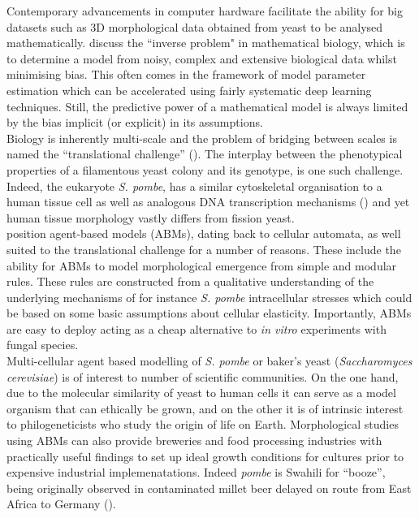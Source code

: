 Contemporary advancements in computer hardware facilitate 
the ability for big datasets such as 3D morphological data 
obtained from yeast to be analysed mathematically. \cite{clermont2015inverse} 
discuss the ``inverse problem" in mathematical biology, which is to determine a model 
from noisy, complex and extensive biological data whilst minimising bias. This often 
comes in the framework of model parameter estimation which 
can be accelerated using fairly systematic deep learning techniques. Still, the predictive power
of a mathematical model is always limited by the bias implicit (or explicit) in its assumptions.
\\

Biology is inherently multi-scale and the problem 
of bridging between scales is named the ``translational challenge'' (\cite{an2009agent}).
The interplay between the phenotypical properties of a filamentous yeast colony and 
its genotype, is one such challenge. Indeed, the eukaryote \textit{S. pombe}, has a similar 
cytoskeletal organisation to a human tissue cell as well as analogous DNA transcription mechanisms 
(\cite{hoffman2015ancient}) and yet human tissue 
morphology vastly differs from fission yeast.
\\

\cite{an2009agent} position agent-based models (ABMs), dating back to cellular automata, as well suited to the 
 translational challenge for a number of reasons. These include the ability 
 for ABMs to model morphological emergence from simple and modular rules. These rules 
 are constructed from a qualitative understanding of the underlying mechanisms of for instance 
 \textit{S. pombe} intracellular stresses which could be based on some basic assumptions
 about cellular elasticity. Importantly, ABMs are easy to deploy acting 
 as a cheap alternative to \textit{in vitro} experiments with fungal species.
 \\

 Multi-cellular agent based modelling of \textit{S. pombe} or baker's yeast 
 (\textit{Saccharomyces cerevisiae}) is of interest to number of scientific  
 communities. On the one hand, due to the molecular similarity of yeast to human 
 cells it can serve as a model organism that can ethically be grown, and on 
 the other it is of intrinsic interest to philogeneticists who study the origin 
 of life on Earth. Morphological studies using ABMs can also provide breweries and 
 food processing industries with practically useful findings to 
 set up ideal growth conditions for cultures prior to expensive 
 industrial implemenatations. Indeed \textit{pombe} is Swahili 
 for ``booze'', being originally observed in contaminated 
 millet beer delayed on route from East Africa to Germany (\cite{hayles2018introduction}).
 \\

